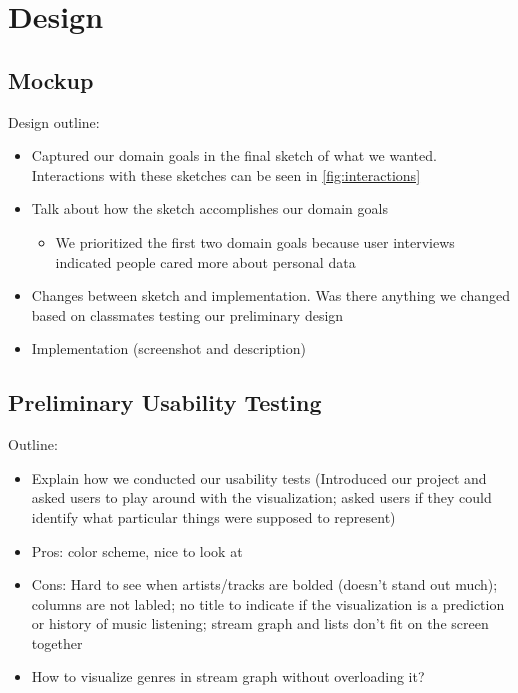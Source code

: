 \documentclass[journal]{vgtc}                %
\begin{document}
\section{Design}

\subsection{Mockup}


Design outline:
\begin{itemize}
  \item Captured our domain goals in the final sketch of what we wanted. Interactions with these sketches can be seen in \autoref{fig:interactions}
  \item Talk about how the sketch accomplishes our domain goals
  \begin{itemize}
    \item We prioritized the first two domain goals because user interviews indicated people cared more about personal data
  \end{itemize}
  \item Changes between sketch and implementation. Was there anything we changed based on classmates testing our preliminary design
  \item Implementation (screenshot and description)
\end{itemize}

\subsection{Preliminary Usability Testing}
Outline:
\begin{itemize}
  \item Explain how we conducted our usability tests (Introduced our project and asked users to play around with the visualization; asked users if they could identify what particular things were supposed to represent)
  \item Pros: color scheme, nice to look at
  \item Cons: Hard to see when artists/tracks are bolded (doesn't stand out much); columns are not labled; no title to indicate if the visualization is a prediction or history of music listening; stream graph and lists don't fit on the screen together
  \item How to visualize genres in stream graph without overloading it?
\end{itemize}
\end{document}
